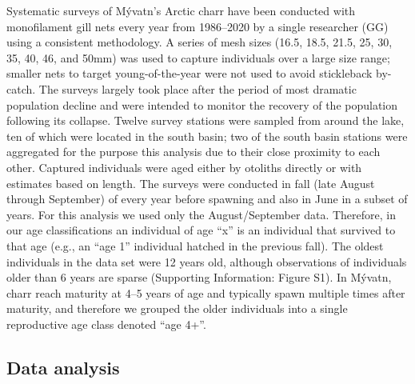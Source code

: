 \documentclass[11pt]{article}
\begin{document}
Systematic surveys of M\'{y}vatn’s Arctic charr have been conducted 
with monofilament gill nets every year from 1986--2020 by a single researcher (GG) 
using a consistent methodology. 
A series of mesh sizes (16.5, 18.5, 21.5, 25, 30, 35, 40, 46, and 50mm) 
was used to capture individuals over a large size range;
smaller nets to target young-of-the-year were not used to avoid stickleback by-catch.
The surveys largely took place after the period of most dramatic population decline 
\citep{gudbergsson2004} 
and were intended to monitor the recovery of the population following its collapse. 
Twelve survey stations were sampled from around the lake,
ten of which were located in the south basin;
two of the south basin stations were aggregated for the purpose this analysis
due to their close proximity to each other. 
Captured individuals were aged either by otoliths directly or 
with estimates based on length.
The surveys were conducted in fall (late August through September) 
of every year before spawning and also in June in a subset of years. 
For this analysis we used only the August/September data. 
Therefore, in our age classifications an individual of age ``x'' is an individual 
that survived to that age (e.g., an ``age 1'' individual hatched in the previous fall). 
The oldest individuals in the data set were 12 years old, although observations 
of individuals older than 6 years are sparse
(Supporting Information: Figure S1). 
In M\'{y}vatn, charr reach maturity at 4--5 years of age and 
typically spawn multiple times after maturity, 
and therefore we grouped the older individuals into a single reproductive age class
denoted ``age 4+''.

\subsection*{Data analysis} 
\end{document}
